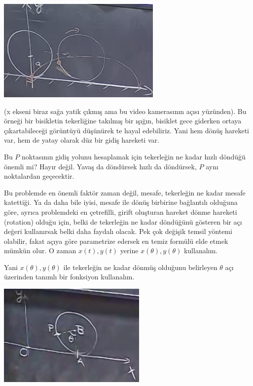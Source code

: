 \documentclass[12pt,fleqn]{article}\usepackage{../../common}
\begin{document}
\begin{center}
\includegraphics[height=5cm]{5_3.png}
\end{center}

(x ekseni biraz sağa yatik çıkmış ama bu video kamerasının açısı yüzünden). Bu
örneği bir bisikletin tekerliğine takılmış bir ışığın, bisiklet gece giderken
ortaya çıkartabileceği görüntüyü düşünürek te hayal edebiliriz. Yani hem dönüş
hareketi var, hem de yatay olarak düz bir gidiş hareketi var.

Bu $P$ noktasının gidiş yolunu hesaplamak için tekerleğin ne kadar hızlı
döndüğü önemli mi? Hayır değil. Yavaş da döndürsek hızlı da döndürsek, $P$ aynı
noktalardan geçecektir. 

Bu problemde en önemli faktör zaman değil, mesafe, tekerleğin ne kadar mesafe
katettiği. Ya da daha bile iyisi, mesafe ile dönüş birbirine bağlantılı olduğuna
göre, ayrıca problemdeki en çetrefilli, girift oluşturan hareket dönme hareketi
(rotation) olduğu için, belki de tekerleğin ne kadar döndüğünü gösteren bir açı
değeri kullanırsak belki daha faydalı olacak. Pek çok değişik temsil yöntemi
olabilir, fakat açıya göre parametrize edersek en temiz formülü elde etmek
mümkün olur. O zaman $x(t),y(t)$ yerine $x(\theta),y(\theta)$ kullanalım.

Yani $x(\theta),y(\theta)$ ile tekerleğin ne kadar dönmüş olduğunu
belirleyen $\theta$ açı üzerinden tanımlı bir fonksiyon kullanalım. 

\begin{center}
\includegraphics[height=5cm]{5_4.png}
\end{center}
\end{document}
